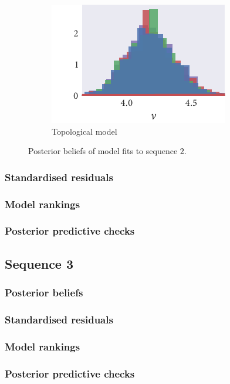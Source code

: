 \begin{figure}[p]
\begin{subfigure}[b]{\textwidth}
    \includegraphics{seq2/top_hist_nu.pdf}%
    \caption{Topological model}
  \end{subfigure}
  \caption{Posterior beliefs of model fits to sequence $2$.}
\end{figure}

\subsubsection{Standardised residuals}

\subsubsection{Model rankings}

\subsubsection{Posterior predictive checks}

\subsection{Sequence 3}

\subsubsection{Posterior beliefs}

\subsubsection{Standardised residuals}

\subsubsection{Model rankings}

\subsubsection{Posterior predictive checks}



